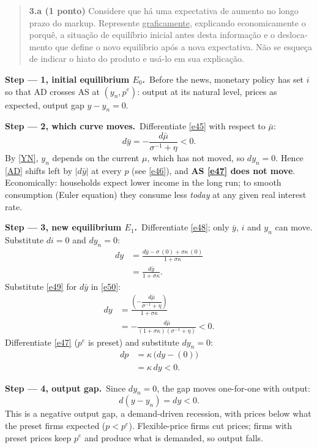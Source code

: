 \documentclass[11pt,a4paper]{article}
\newcommand{\enunciado}[1]{\par\smallskip\noindent{\footnotesize\textit{Statement, as printed in the exam:}}%
  \begin{quote}\small\begin{otherlanguage}{portuguese}#1\end{otherlanguage}\end{quote}}
\newcommand{\itemq}[1]{\par\medskip\needspace{6\baselineskip}\enunciado{#1}}
\newcommand{\passo}[1]{\par\smallskip\noindent\textbf{Step --- #1.}~}
\begin{document}
\itemq{\textbf{3.a (1 ponto)} Considere que há uma expectativa de aumento no longo prazo do markup.
Represente \underline{graficamente}, explicando economicamente o porquê, a situação de equilíbrio
inicial antes desta informação e o deslocamento que define o novo equilíbrio após a nova
expectativa. Não se esqueça de indicar o hiato do produto e usá-lo em sua explicação.}
\passo{1, initial equilibrium $E_0$}Before the news, monetary policy has set $i$ so that AD crosses
AS at $(y_n,p^e)$: output at its natural level, prices as expected, output gap $y-y_n=0$.
\passo{2, which curve moves}Differentiate \eqref{e45} with respect to $\bar\mu$:
\begin{equation}
d\bar y=-\frac{d\bar\mu}{\sigma^{-1}+\eta}<0. \label{e49}
\end{equation}
By \eqref{YN}, $y_n$ depends on the current $\mu$, which has not moved, so $dy_n=0$.
Hence \eqref{AD} shifts left by $|d\bar y|$ at every $p$ (see \eqref{e46}), and \textbf{AS
\eqref{e47} does not move}. Economically: households expect lower income in the long run; to smooth
consumption (Euler equation) they consume less \emph{today} at any given real interest rate.
\passo{3, new equilibrium $E_1$}Differentiate \eqref{e48}; only $\bar y$, $i$ and $y_n$ can move.
Substitute $di=0$ and $dy_n=0$:
\begin{align}
dy &= \frac{d\bar y-\sigma\,(0)+\sigma\kappa\,(0)}{1+\sigma\kappa}\nonumber\\
&= \frac{d\bar y}{1+\sigma\kappa}. \label{e50}
\end{align}
Substitute \eqref{e49} for $d\bar y$ in \eqref{e50}:
\begin{align*}
dy &= \frac{\left(-\dfrac{d\bar\mu}{\sigma^{-1}+\eta}\right)}{1+\sigma\kappa}\\
&= -\frac{d\bar\mu}{(1+\sigma\kappa)(\sigma^{-1}+\eta)}<0 .
\end{align*}
Differentiate \eqref{e47} ($p^e$ is preset) and substitute $dy_n=0$:
\begin{align}
dp &= \kappa\,\big(dy-(0)\big)\nonumber\\
&= \kappa\,dy<0. \label{e51}
\end{align}
\passo{4, output gap}Since $dy_n=0$, the gap moves one-for-one with output:
\[
d(y-y_n)=dy<0 .
\]
This is a negative output gap, a demand-driven recession, with prices below what the preset firms
expected ($p<p^e$). Flexible-price firms cut prices; firms with preset prices keep $p^e$ and produce
what is demanded, so output falls.
\end{document}
